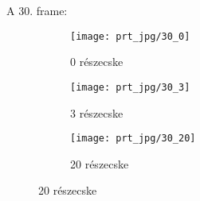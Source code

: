 \noindent A 30. frame:
\begin{figure}[!htb]
    \centering
    \begin{subfigure}[!htb]{0.32\textwidth}
        \centering
        \texttt{[image: prt\_jpg/30\_0]}
        \caption{0 részecske}
    \end{subfigure}
    \hfill
    \begin{subfigure}[!htb]{0.32\textwidth}
        \centering
        \texttt{[image: prt\_jpg/30\_3]}
        \caption{3 részecske}
    \end{subfigure}
    \hfill
    \begin{subfigure}[!htb]{0.32\textwidth}
        \centering
        \texttt{[image: prt\_jpg/30\_20]}
        \caption{20 részecske}
    \end{subfigure}
\end{figure}





